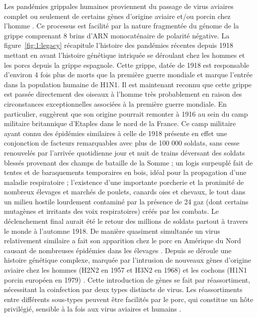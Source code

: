 Les pandémies grippales humaines proviennent du passage de virus
aviaires complet ou seulement de certains gènes d'origine aviaire
et/ou porcin chez l'homme \citep{Zimmer2009}. Ce processus est
facilité par la nature fragmentée du génome de la grippe comprenant 8
brins d'ARN monocaténaire de polarité négative. La
figure~\ref{fig:1:legacy} récapitule l'histoire des pandémies récentes
depuis 1918 mettant en avant l'histoire génétique intriquée se
déroulant chez les hommes et les porcs depuis la grippe espagnole.
Cette grippe, datée de 1918 est responsable d'environ 4 fois plus de
morts que la première guerre mondiale et marque l'entrée dans la
population humaine de H1N1. Il est maintenant reconnu que cette grippe
est passée directement des oiseaux à l'homme très probablement en
raison des circonstances exceptionnelles associées à la première
guerre mondiale. En particulier, \citet{Oxford2005} suggèrent que son
origine pourrait remonter à 1916 au sein du camp militaire britannique
d'Etaples dans le nord de la France. Ce camp militaire ayant connu des
épidémies similaires à celle de 1918 présente en effet une conjonction
de facteurs remarquables avec plus de 100 000 soldats, sans cesse
renouvelés par l'arrivée quotidienne jour et nuit de trains déversant
des soldats blessés provenant des champs de bataille de la Somme ; un
logis surpeuplé fait de tentes et de baraquements temporaires en bois,
idéal pour la propagation d'une maladie respiratoire ; l'existence
d'une importante porcherie et la proximité de nombreux élevages et
marchés de poulets, canards oies et chevaux, le tout dans un milieu
hostile lourdement contaminé par la présence de 24 gaz (dont certains
mutagènes et irritants des voix respiratoires) créés par les combats.
Le déclenchement final aurait été le retour des millions de soldats
partout à travers le monde à l'automne 1918. De manière quasiment
simultanée un virus relativement similaire a fait son apparition chez
le porc en Amérique du Nord causant de nombreuses épidémies dans les
élevages \citep{Zimmer2009}. Depuis se déroule une histoire génétique
complexe, marquée par l'intrusion de nouveaux gènes d'origine aviaire
chez les hommes (H2N2 en 1957 et H3N2 en 1968) et les cochons (H1N1
porcin européen en 1979) \citep{Morens2009}. Cette introduction de
gènes se fait par réassortiment, nécessitant la coinfection par deux
types distincts de virus. Les réassortiments entre différents
sous-types peuvent être facilités par le porc, qui constitue un hôte
privilégié, sensible à la fois aux virus aviaires et humains
\citep{Webster1992}.

